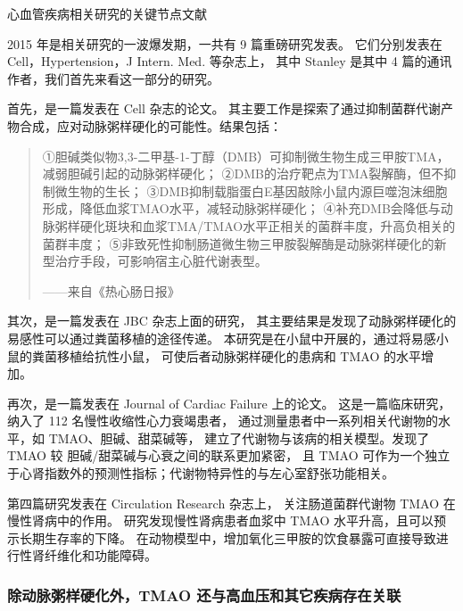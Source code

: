 \documentclass[]{ctexbook}
\begin{document}
\hypertarget{htmlwidget-fb1736a318515e9669c5}{}

\label{fig:cvd-histplot-articles}心血管疾病相关研究的关键节点文献

2015 年是相关研究的一波爆发期，一共有 9 篇重磅研究发表。
它们分别发表在 Cell，Hypertension，J Intern. Med. 等杂志上，
其中 Stanley 是其中 4 篇的通讯作者，我们首先来看这一部分的研究。

首先，是一篇发表在 Cell 杂志的论文\citep{wangNonlethalInhibitionGut2015}。
其主要工作是探索了通过抑制菌群代谢产物合成，应对动脉粥样硬化的可能性。结果包括：

\begin{quote}
①胆碱类似物3,3-二甲基-1-丁醇（DMB）可抑制微生物生成三甲胺TMA，减弱胆碱引起的动脉粥样硬化；
②DMB的治疗靶点为TMA裂解酶，但不抑制微生物的生长；
③DMB抑制载脂蛋白E基因敲除小鼠内源巨噬泡沫细胞形成，降低血浆TMAO水平，减轻动脉粥样硬化；
④补充DMB会降低与动脉粥样硬化斑块和血浆TMA/TMAO水平正相关的菌群丰度，升高负相关的菌群丰度；
⑤非致死性抑制肠道微生物三甲胺裂解酶是动脉粥样硬化的新型治疗手段，可影响宿主心脏代谢表型。
\begin{flushright}------来自《热心肠日报》\end{flushright}
\end{quote}

其次，是一篇发表在 JBC 杂志上面的研究，
其主要结果是发现了动脉粥样硬化的易感性可以通过粪菌移植的途径传递\citep{gregoryTransmissionAtherosclerosisSusceptibility2015}。
本研究是在小鼠中开展的，通过将易感小鼠的粪菌移植给抗性小鼠，
可使后者动脉粥样硬化的患病和 TMAO 的水平增加。

再次，是一篇发表在 Journal of Cardiac Failure 上的论文\citep{tangIntestinalMicrobiotaDependentPhosphatidylcholine2015}。
这是一篇临床研究，纳入了 112 名慢性收缩性心力衰竭患者，
通过测量患者中一系列相关代谢物的水平，如 TMAO、胆碱、甜菜碱等，
建立了代谢物与该病的相关模型。发现了 TMAO 较 胆碱/甜菜碱与心衰之间的联系更加紧密，
且 TMAO 可作为一个独立于心肾指数外的预测性指标；代谢物特异性的与左心室舒张功能相关。

第四篇研究发表在 Circulation Research 杂志上，
关注肠道菌群代谢物 TMAO 在慢性肾病中的作用\citep{tangw.h.wilsonGutMicrobiotaDependentTrimethylamine2015}。
研究发现慢性肾病患者血浆中 TMAO 水平升高，且可以预示长期生存率的下降。
在动物模型中，增加氧化三甲胺的饮食暴露可直接导致进行性肾纤维化和功能障碍。

\hypertarget{ux9664ux52a8ux8109ux7ca5ux6837ux786cux5316ux5916tmao-ux8fd8ux4e0eux9ad8ux8840ux538bux548cux5176ux5b83ux75beux75c5ux5b58ux5728ux5173ux8054}{%
\subsubsection{除动脉粥样硬化外，TMAO 还与高血压和其它疾病存在关联}\label{ux9664ux52a8ux8109ux7ca5ux6837ux786cux5316ux5916tmao-ux8fd8ux4e0eux9ad8ux8840ux538bux548cux5176ux5b83ux75beux75c5ux5b58ux5728ux5173ux8054}}
\end{document}
